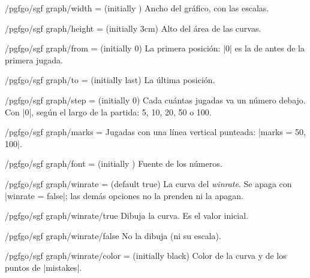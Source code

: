 \begin{key}{/pgfgo/sgf graph/width =  (initially \string\linewidth)}
	Ancho del gráfico, con las escalas.
\end{key}

\begin{key}{/pgfgo/sgf graph/height =  (initially 3cm)}
	Alto del área de las curvas.
\end{key}

\begin{key}{/pgfgo/sgf graph/from =  (initially 0)}
	La primera posición: |0| es la de antes de la primera jugada.
\end{key}

\begin{key}{/pgfgo/sgf graph/to =  (initially last)}
	La última posición.
\end{key}

\begin{key}{/pgfgo/sgf graph/step =  (initially 0)}
	Cada cuántas jugadas va un número debajo. Con |0|, según el largo de la partida: 5, 10, 20, 50 o 100.
\end{key}

\begin{key}{/pgfgo/sgf graph/marks = }
	Jugadas con una línea vertical punteada: |marks = {50, 100}|.
\end{key}

\begin{key}{/pgfgo/sgf graph/font =  (initially \string\footnotesize)}
	Fuente de los números.
\end{key}

\begin{key}{/pgfgo/sgf graph/winrate =  (default true)}
	La curva del \emph{winrate}. Se apaga con |winrate = false|; las demás opciones no la prenden ni la apagan.
\end{key}

\begin{stylekey}{/pgfgo/sgf graph/winrate/true}
	Dibuja la curva. Es el valor inicial.
\end{stylekey}

\begin{stylekey}{/pgfgo/sgf graph/winrate/false}
	No la dibuja (ni su escala).
\end{stylekey}

\begin{key}{/pgfgo/sgf graph/winrate/color =  (initially black)}
	Color de la curva y de los puntos de |mistakes|.
\end{key}


